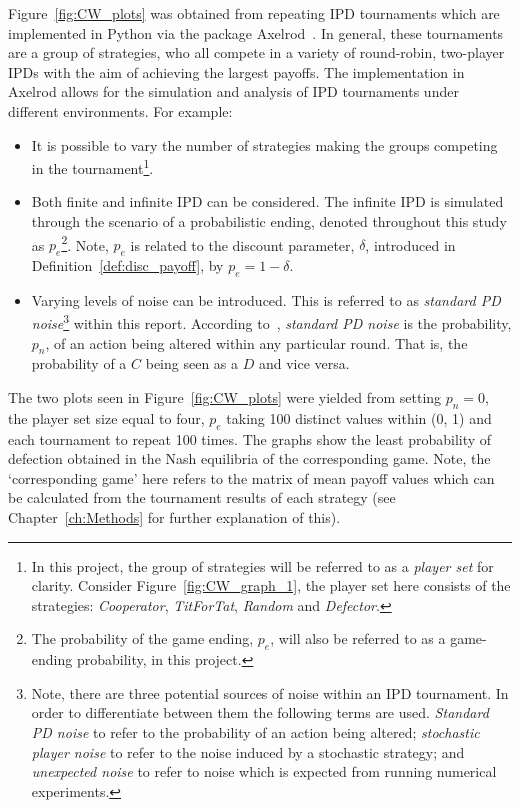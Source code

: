 Figure~\ref{fig:CW_plots} was obtained from repeating IPD tournaments which are
implemented in Python via the package Axelrod~\cite{axelrodproject}. In general,
these tournaments are a group of strategies, who all compete in a variety of
round-robin, two-player IPDs with the aim of achieving the largest payoffs. The
implementation in Axelrod allows for the simulation and analysis of IPD
tournaments under different environments. For example:
\begin{itemize}
    \item It is possible to vary the number of strategies making the groups competing in the
    tournament\footnote{In this project, the group of strategies will be
    referred to as a \textit{player set} for clarity.
    Consider Figure~\ref{fig:CW_graph_1}, the player set here consists of the
    strategies: \textit{Cooperator}, \textit{TitForTat}, \textit{Random} and
    \textit{Defector}.}.
    
    \item Both finite and infinite IPD can be considered. The infinite IPD is
    simulated through the scenario of a probabilistic ending, denoted throughout
    this study as \(p_{e}\)\footnote{The probability of the game ending,
    \(p_{e}\), will also be referred to as a game-ending
    probability, in this project.}. Note, \(p_{e}\) is related to the discount
    parameter, \(\delta \), introduced in Definition~\ref{def:disc_payoff}, by \(p_{e}
    = 1 - \delta \).
    
    \item Varying levels of noise can be introduced. This is referred to as
    \textit{standard PD noise}\footnote{Note, there are three potential sources
    of noise within an IPD tournament. In order to differentiate between them
    the following terms are used. \textit{Standard PD noise} to refer to the
    probability of an action being altered; \textit{stochastic player noise} to
    refer to the noise induced by a stochastic strategy; and \textit{unexpected
    noise} to refer to noise which is expected from running numerical experiments.} within this report. According
    to~\cite{glynatsi2020meta}, \textit{standard PD noise} is the probability,
    \(p_{n}\), of an action being altered within any particular round. That is,
    the probability of a \(C\) being seen as a \(D\) and vice versa.
\end{itemize}

The two plots seen in Figure~\ref{fig:CW_plots} were yielded from setting \(p_{n} =
0\), the player set size equal to four, \(p_{e}\) taking 100 distinct values
within (0, 1) and each tournament to repeat 100 times. The graphs show the least
probability of defection obtained in the Nash equilibria of the corresponding
game. Note, the `corresponding game' here refers to the matrix of mean payoff
values which can be calculated from the tournament results of each strategy
(see Chapter~\ref{ch:Methods} for further explanation of this).  

